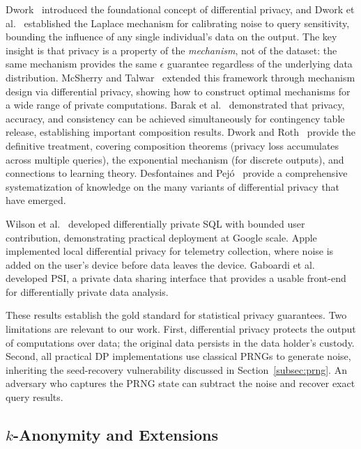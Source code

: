\documentclass[journal]{IEEEtran}
\begin{document}
Dwork~\cite{dwork2006icalp} introduced the foundational concept of differential privacy, and Dwork et al.~\cite{dwork2006dp} established the Laplace mechanism for calibrating noise to query sensitivity, bounding the influence of any single individual's data on the output. The key insight is that privacy is a property of the \emph{mechanism}, not of the dataset: the same mechanism provides the same $\epsilon$ guarantee regardless of the underlying data distribution. McSherry and Talwar~\cite{mcsherry2007mechanism} extended this framework through mechanism design via differential privacy, showing how to construct optimal mechanisms for a wide range of private computations. Barak et al.~\cite{barak2007privacy} demonstrated that privacy, accuracy, and consistency can be achieved simultaneously for contingency table release, establishing important composition results. Dwork and Roth~\cite{dwork2014algfound} provide the definitive treatment, covering composition theorems (privacy loss accumulates across multiple queries), the exponential mechanism (for discrete outputs), and connections to learning theory. Desfontaines and Pej\'{o}~\cite{desfontaines2020sok} provide a comprehensive systematization of knowledge on the many variants of differential privacy that have emerged.

Wilson et al.~\cite{wilson2020dpsql} developed differentially private SQL with bounded user contribution, demonstrating practical deployment at Google scale. Apple~\cite{apple2017dp} implemented local differential privacy for telemetry collection, where noise is added on the user's device before data leaves the device. Gaboardi et al.~\cite{gaboardi2016psi} developed PSI, a private data sharing interface that provides a usable front-end for differentially private data analysis.

These results establish the gold standard for statistical privacy guarantees. Two limitations are relevant to our work. First, differential privacy protects the output of computations over data; the original data persists in the data holder's custody. Second, all practical DP implementations use classical PRNGs to generate noise, inheriting the seed-recovery vulnerability discussed in Section~\ref{subsec:prng}. An adversary who captures the PRNG state can subtract the noise and recover exact query results.

\subsection{$k$-Anonymity and Extensions}
\label{subsec:kanon}
\end{document}

